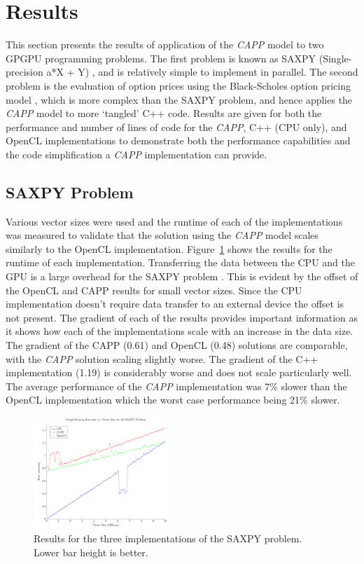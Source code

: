 \documentclass{sig-alternate-05-2015}
\begin{document}
\section{Results}\label{sec:results}

This section presents the results of application of the \textit{CAPP} model to two
GPGPU programming problems. The first problem is known as SAXPY
(Single-precision a*X + Y) \cite{harris:saxpy}, and is relatively 
simple to implement in parallel. The second problem is the evaluation of option 
prices using the Black-Scholes option pricing model \cite{gems:blackscholes},
which is more complex than the SAXPY problem, and hence applies the \textit{CAPP} model 
to more `tangled' C++ code. Results are given for both the performance and
number of lines of code for the \textit{CAPP}, C++ (CPU only), and OpenCL
implementations to demonstrate both the performance capabilities and the code
simplification a \textit{CAPP} implementation can provide. 

\subsection{SAXPY Problem}

Various vector sizes were used and the runtime of each of the implementations
was measured to validate that the solution using the
\textit{CAPP} model scales similarly to the OpenCL implementation. Figure~\ref{fig:saxpy} 
shows the results for the runtime of each implementation. Transferring
the data between the CPU and the GPU is a large overhead for the SAXPY problem
\cite{gregg:saxpy}. This is evident by the offset of the
OpenCL and CAPP results for small vector sizes. Since the CPU implementation
doesn't require data transfer to an external device the offset is not present.
The gradient of each of the results provides important information as it shows
how each of the implementations scale with an increase in the data size. 
The gradient of the CAPP (0.61) and OpenCL (0.48) solutions are comparable, with
the \textit{CAPP} solution scaling slightly worse. The gradient of the C++
implementation (1.19) is considerably worse and does not scale particularly
well. The average performance of the \textit{CAPP} implementation was 7\% slower
than the OpenCL implementation which the worst case performance being 21\%
slower.

\begin{figure}[!t]
	\centering
	\includegraphics[width=0.45\textwidth]{Saxpy}
	\caption{Results for the three implementations of the SAXPY problem. Lower
	bar height is better.}
	\label{fig:saxpy}
\end{figure}
\end{document}
